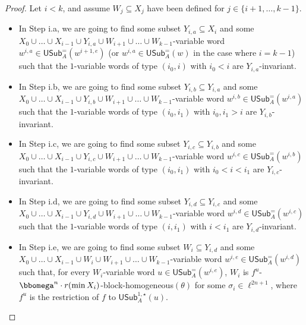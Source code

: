 \documentclass{article}
\numberwithin{theorem}{section}
\newcommand{\USub}{\mathsf{USub}}
\begin{document}
\begin{proof}
\noindent
Let $i <k$, and assume $W_j \subseteq X_j$ have been defined for $j \in \{i+1, \dots, k-1\}$.
\begin{itemize}
    \item In Step i.a, we are going to find some subset $Y_{i,a} \subseteq X_i$ and some $X_0 \cup \dots \cup X_{i-1} \cup Y_{i,a} \cup W_{i+1} \cup \dots \cup W_{k-1}$-variable word $w^{i,a} \in \USub_A^=(w^{i+1,e})$ (or $w^{i,a} \in \USub_A^=(w)$ in the case where $i = k-1$) such that the $1$-variable words of type $(i_0,i)$ with $i_0 < i$ are $Y_{i,a}$-invariant.
    \item In Step i.b, we are going to find some subset $Y_{i,b} \subseteq Y_{i,a}$ and some $X_0 \cup \dots \cup X_{i-1} \cup Y_{i,b} \cup W_{i+1} \cup \dots \cup W_{k-1}$-variable word $w^{i,b} \in \USub_A^=(w^{i,a})$ such that the $1$-variable words of type $(i_0,i_1)$ with $i_0,i_1 > i$ are $Y_{i,b}$-invariant.
    \item In Step i.c, we are going to find some subset $Y_{i,c} \subseteq Y_{i,b}$ and some $X_0 \cup \dots \cup X_{i-1} \cup Y_{i,c} \cup W_{i+1} \cup \dots \cup W_{k-1}$-variable word $w^{i,c} \in \USub_A^=(w^{i,b})$ such that the $1$-variable words of type $(i_0,i_1)$ with $i_0 < i < i_1$ are $Y_{i,c}$-invariant.
    \item In Step i.d, we are going to find some subset $Y_{i,d} \subseteq Y_{i,c}$ and some $X_0 \cup \dots \cup X_{i-1} \cup Y_{i,d} \cup W_{i+1} \cup \dots \cup W_{k-1}$-variable word $w^{i,d} \in \USub_A^=(w^{i,c})$ such that the $1$-variable words of type $(i,i_1)$ with $i < i_1$ are $Y_{i,d}$-invariant.
    \item In Step i.e, we are going to find some subset $W_i \subseteq Y_{i,d}$ and some $X_0 \cup \dots \cup X_{i-1} \cup W_i \cup W_{i+1} \cup \dots \cup W_{k-1}$-variable word $w^{i,e} \in \USub_A^=(w^{i,d})$ such that, for every $W_i$-variable word $u \in \USub_A^{=}(w^{i,e})$, $W_i$ is $f^u$-$\bbomega^n\cdot r(\min X_i)$-block-homogeneous$(\theta)$ for some $\sigma_i \in \ell^{2n+1}$, where $f^u$ is the restriction of $f$ to $\USub^{1,\star}_A(u)$.


\end{itemize}
\end{proof}
\end{document}
